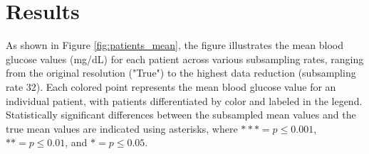 
\section{Results}
As shown in Figure \ref{fig:patients_mean}, the figure illustrates the mean blood glucose values (mg/dL) for each patient across various subsampling rates, ranging from the original resolution ("True") to the highest data reduction (subsampling rate 32). Each colored point represents the mean blood glucose value for an individual patient, with patients differentiated by color and labeled in the legend. Statistically significant differences between the subsampled mean values and the true mean values are indicated using asterisks, where $\ast \ast \ast = p \le 0.001$, $\ast \ast  = p \le 0.01$, and $\ast = p \le 0.05$.
